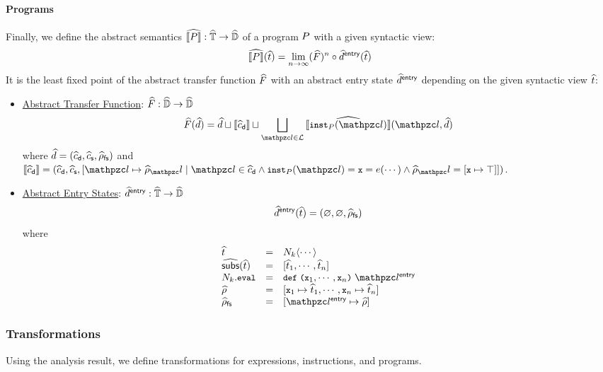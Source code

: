 \paragraph{Programs} Finally, we define the abstract semantics $\widehat{\llbracket{P}\rrbracket}:
\widehat{\mathbb{T}} \rightarrow \widehat{\mathbb{D}}$ of a program $P$ with a given syntactic
view:
\[
  \widehat{\llbracket{P}\rrbracket}(\widehat{t}) = \lim_{n \rightarrow \infty}(\widehat{F})^n \circ
  \widehat{d}^{\textsf{entry}}(\widehat{t})
\]
It is the least fixed point of the abstract transfer function $\widehat{F}$ with
an abstract entry state $\widehat{d}^{\textsf{entry}}$ depending on the given syntactic view
$\widehat{t}$:
\begin{itemize}
  \item \underline{Abstract Transfer Function}: $\widehat{F}: \widehat{\mathbb{D}}
    \rightarrow \widehat{\mathbb{D}}$
    \[
      \atransfer(\aelem) = \aelem \join \sem{\adcall} \join
      \bigjoin_{\lab \in \labset}{\asem{\getinst{\prog}(\lab)}(\lab, \aelem)}
    \]
    where $\widehat{d} = (\widehat{c}_{\textsf{d}}, \widehat{c}_{\textsf{s}}, \widehat{\rho}_{\textsf{fs}})$ and $\sem{\adcall} = (\adcall,
    \ascall, [\lab \mapsto \aenv_\lab \mid \lab \in \adcall \wedge
    \getinst{\prog}(\lab) = \varx = \expr(\cdots) \wedge \aenv_\lab = [\varx
    \mapsto \top]])$.
  \item \underline{Abstract Entry States}: $\widehat{d}^{\textsf{entry}}:
    \widehat{\mathbb{T}} \rightarrow \widehat{\mathbb{D}}$
    \[
      \widehat{d}^{\textsf{entry}}(\widehat{t}) = (\varnothing, \varnothing, \widehat{\rho}_{\textsf{fs}})
    \]
    where \[
      \begin{array}{lcl}
        \atree &=& \nt_k \langle \cdots \rangle\\

        \agetsubs(\atree) &=& [\atree_1, \cdots, \atree_n]\\

        \nt_k.\eval &=& \kwdef \; \kwrl \varx_1, \cdots, \varx_n \kwrr
        \; \entrylab\\

        \aenv &=& [\varx_1 \mapsto \atree_1, \cdots, \varx_n \mapsto
        \atree_n]\\

        \afsenv &=& [\entrylab \mapsto \aenv]\\
      \end{array}
    \]
\end{itemize}


\subsubsection{Transformations}

Using the analysis result, we define transformations for expressions,
instructions, and programs.

